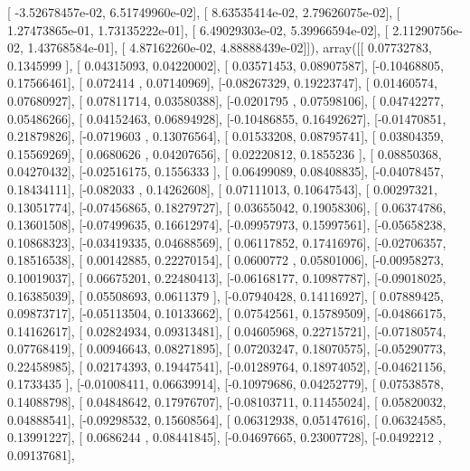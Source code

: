 \documentclass{article}
\begin{document}
       [ -3.52678457e-02,   6.51749960e-02],
       [  8.63535414e-02,   2.79626075e-02],
       [  1.27473865e-01,   1.73135222e-01],
       [  6.49029303e-02,   5.39966594e-02],
       [  2.11290756e-02,   1.43768584e-01],
       [  4.87162260e-02,   4.88888439e-02]]), array([[ 0.07732783,  0.1345999 ],
       [ 0.04315093,  0.04220002],
       [ 0.03571453,  0.08907587],
       [-0.10468805,  0.17566461],
       [ 0.072414  ,  0.07140969],
       [-0.08267329,  0.19223747],
       [ 0.01460574,  0.07680927],
       [ 0.07811714,  0.03580388],
       [-0.0201795 ,  0.07598106],
       [ 0.04742277,  0.05486266],
       [ 0.04152463,  0.06894928],
       [-0.10486855,  0.16492627],
       [-0.01470851,  0.21879826],
       [-0.0719603 ,  0.13076564],
       [ 0.01533208,  0.08795741],
       [ 0.03804359,  0.15569269],
       [ 0.0680626 ,  0.04207656],
       [ 0.02220812,  0.1855236 ],
       [ 0.08850368,  0.04270432],
       [-0.02516175,  0.1556333 ],
       [ 0.06499089,  0.08408835],
       [-0.04078457,  0.18434111],
       [-0.082033  ,  0.14262608],
       [ 0.07111013,  0.10647543],
       [ 0.00297321,  0.13051774],
       [-0.07456865,  0.18279727],
       [ 0.03655042,  0.19058306],
       [ 0.06374786,  0.13601508],
       [-0.07499635,  0.16612974],
       [-0.09957973,  0.15997561],
       [-0.05658238,  0.10868323],
       [-0.03419335,  0.04688569],
       [ 0.06117852,  0.17416976],
       [-0.02706357,  0.18516538],
       [ 0.00142885,  0.22270154],
       [ 0.0600772 ,  0.05801006],
       [-0.00958273,  0.10019037],
       [ 0.06675201,  0.22480413],
       [-0.06168177,  0.10987787],
       [-0.09018025,  0.16385039],
       [ 0.05508693,  0.0611379 ],
       [-0.07940428,  0.14116927],
       [ 0.07889425,  0.09873717],
       [-0.05113504,  0.10133662],
       [ 0.07542561,  0.15789509],
       [-0.04866175,  0.14162617],
       [ 0.02824934,  0.09313481],
       [ 0.04605968,  0.22715721],
       [-0.07180574,  0.07768419],
       [ 0.00946643,  0.08271895],
       [ 0.07203247,  0.18070575],
       [-0.05290773,  0.22458985],
       [ 0.02174393,  0.19447541],
       [-0.01289764,  0.18974052],
       [-0.04621156,  0.1733435 ],
       [-0.01008411,  0.06639914],
       [-0.10979686,  0.04252779],
       [ 0.07538578,  0.14088798],
       [ 0.04848642,  0.17976707],
       [-0.08103711,  0.11455024],
       [ 0.05820032,  0.04888541],
       [-0.09298532,  0.15608564],
       [ 0.06312938,  0.05147616],
       [ 0.06324585,  0.13991227],
       [ 0.0686244 ,  0.08441845],
       [-0.04697665,  0.23007728],
       [-0.0492212 ,  0.09137681],
\end{document}
